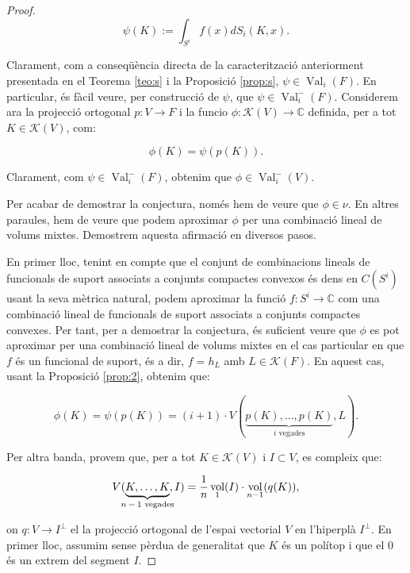 \documentclass{article}
\theoremstyle{definition}
\DeclareMathOperator{\Val}{Val}
\DeclareMathOperator{\vol}{vol}
\begin{document}
\begin{proof}
\[ \psi(K) := \int_{S^i} f(x) dS_i(K,x).\]

Clarament, com a conseq\"{u}\`{e}ncia directa de la caracteritzaci\'{o} anteriorment presentada en el Teorema \ref{teo:s} i la Proposici\'{o} \ref{prop:s}, $\psi \in \Val_i(F)$. En particular, \'{e}s f\`{a}cil veure, per construcci\'{o} de $\psi$, que $\psi \in \Val_i^-(F)$. Considerem ara la projecci\'{o} ortogonal $p: V \longrightarrow F$ i la funcio $\phi: \mathcal{K}(V) \longrightarrow \mathbb{C}$ definida, per a tot $K \in \mathcal{K}(V)$, com:

\[ \phi(K) = \psi(p(K)).\]

Clarament, com $\psi \in \Val_i^-(F)$, obtenim que $\phi \in \Val_i^-(V)$.

Per acabar de demostrar la conjectura, nom\'{e}s hem de veure que $\phi \in \nu$. En altres paraules, hem de veure que podem aproximar $\phi$ per una combinaci\'{o} lineal de volums mixtes. Demostrem aquesta afirmaci\'{o} en diversos pasos.

En primer lloc, tenint en compte que el conjunt de combinacions lineals de funcionals de suport associats a conjunts compactes convexos \'{e}s dens en $C(S^{i})$ usant la seva m\`{e}trica natural, podem aproximar la funci\'{o} $f: S^i \longrightarrow \mathbb{C}$ com una combinaci\'{o} lineal de funcionals de suport associats a conjunts compactes convexes. Per tant, per a demostrar la conjectura, \'{e}s suficient veure que $\phi$ es pot aproximar per una combinaci\'{o} lineal de volums mixtes en el cas particular en que $f$ \'{e}s un funcional de suport, \'{e}s a dir, $f=h_L$ amb $L \in \mathcal{K}(F)$. En aquest cas, usant la Proposici\'{o} \ref{prop:2}, obtenim que:

\begin{equation} \label{eq:162}
    \phi(K) = \psi(p(K)) = (i+1) \cdot V(\underbrace{p(K), \dots, p(K)}_{\text{$i$ vegades}}, L).
\end{equation}

Per altra banda, provem que, per a tot $K \in \mathcal{K}(V)$ i $I \subset V$, es compleix que:

\begin{equation} \label{eq:163}
    V(\underbrace{K, \dots, K}_{\mathclap{\text{$n-1$ vegades}}}, I) = \frac{1}{n} \vol_1 (I) \cdot \vol_{n-1} (q(K)),
\end{equation}

on $q: V \longrightarrow I^{\perp}$ el la projecci\'{o} ortogonal de l'espai vectorial $V$ en l'hiperpl\`{a} $I^{\perp}$. En primer lloc, assumim sense p\`{e}rdua de generalitat que $K$ \'{e}s un pol\'{i}top i que el $0$ \'{e}s un extrem del segment $I$.


\end{proof}
\end{document}
